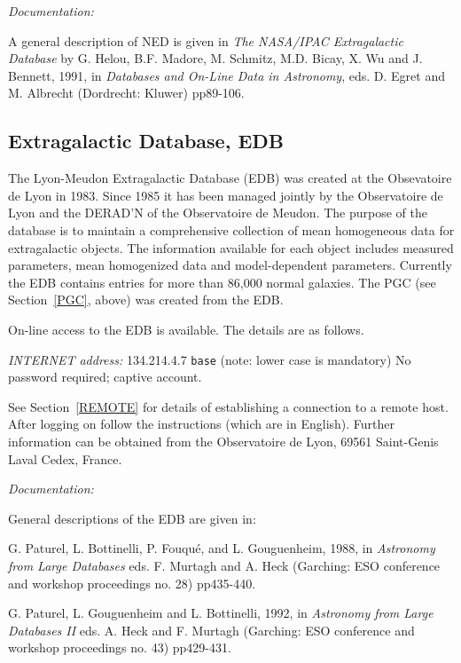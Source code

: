 \documentclass[twoside,11pt]{article}
\newcommand{\xlabel}[1]{}
\begin{document}
{\it Documentation:}

A general description of NED is given in {\it The NASA/IPAC 
Extragalactic Database} by G. Helou, B.F. Madore, M. Schmitz, M.D. 
Bicay, X. Wu and J. Bennett, 1991, in {\it Databases and On-Line Data in
Astronomy}, eds. D. Egret and M. Albrecht (Dordrecht: Kluwer) pp89-106.

\subsection{Extragalactic Database, EDB
\xlabel{extragalactic_database_edb}\label{EDB}}

The Lyon-Meudon Extragalactic Database (EDB) was created at the 
Obsevatoire de Lyon in 1983. Since 1985 it has been managed jointly by 
the Observatoire de Lyon and the DERAD'N of the Observatoire de Meudon.
The purpose of the database is to maintain a comprehensive collection
of mean homogeneous data for extragalactic objects. The information 
available for each object includes measured parameters, mean homogenized
data and model-dependent parameters. Currently the EDB contains entries
for more than 86,000 normal galaxies. The PGC (see Section~\ref{PGC},
above) was created from the EDB.

On-line access to the EDB is available. The details are as follows.

{\it INTERNET address:} 134.214.4.7
 \verb-base- (note: lower case is mandatory) 
 No password required; captive account.

See Section~\ref{REMOTE} for details of establishing a connection to
a remote host. After logging on follow the instructions (which are in
English). Further information can be obtained from the Observatoire de 
Lyon, 69561 Saint-Genis Laval Cedex, France.

{\it Documentation:}

General descriptions of the EDB are given in:

G. Paturel, L. Bottinelli, P. Fouqu\'{e}, and L. Gouguenheim, 1988, in 
{\it Astronomy from Large Databases} eds. F. Murtagh and A. Heck 
(Garching: ESO conference and workshop proceedings no. 28) pp435-440.

G. Paturel, L. Gouguenheim and L. Bottinelli, 1992, in 
{\it Astronomy from Large Databases II} eds. A. Heck and F. Murtagh
(Garching: ESO conference and workshop proceedings no. 43) pp429-431.
\end{document}
